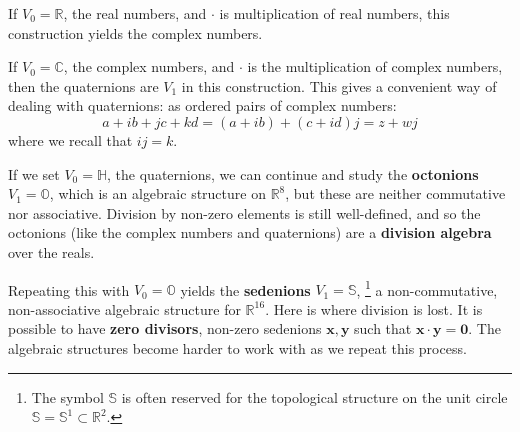 \documentclass{article}
\begin{document}
            If $V_{0}=\mathbb{R}$, the real numbers,
            and $\cdot$ is multiplication of real numbers,
            this construction yields the complex numbers.
            \par\hfill\par
            If $V_{0}=\mathbb{C}$, the complex numbers,
            and $\cdot$ is the multiplication of
            complex numbers, then the quaternions are $V_{1}$ in this
            construction. This gives a convenient way of dealing with
            quaternions: as ordered pairs of complex numbers:
            \begin{equation}
                a+ib+jc+kd
                =(a+ib)+(c+id)j
                =z+wj
            \end{equation}
            where we recall that $ij=k$.
            \par\hfill\par
            If we set $V_{0}=\mathbb{H}$, the quaternions,
            we can continue and study the
            \textbf{octonions} $V_{1}=\mathbb{O}$, which is an
            algebraic structure on $\mathbb{R}^{8}$, but these are
            neither commutative nor associative. Division by non-zero elements
            is still well-defined, and so the octonions (like the complex
            numbers and quaternions) are a \textbf{division algebra}
            over the reals.
            \par\hfill\par
            Repeating this with $V_{0}=\mathbb{O}$ yields the \textbf{sedenions}
            $V_{1}=\mathbb{S}$,%
            \footnote{
                The symbol $\mathbb{S}$ is often reserved for the topological
                structure on the unit circle
                $\mathbb{S}=\mathbb{S}^{1}\subset\mathbb{R}^{2}$.
            }
            a non-commutative, non-associative algebraic
            structure for $\mathbb{R}^{16}$. Here is where division is lost.
            It is possible to have \textbf{zero divisors}, non-zero sedenions
            $\mathbf{x},\mathbf{y}$ such that
            $\mathbf{x}\cdot\mathbf{y}=\mathbf{0}$. The algebraic structures
            become harder to work with as we repeat this process.
\end{document}
